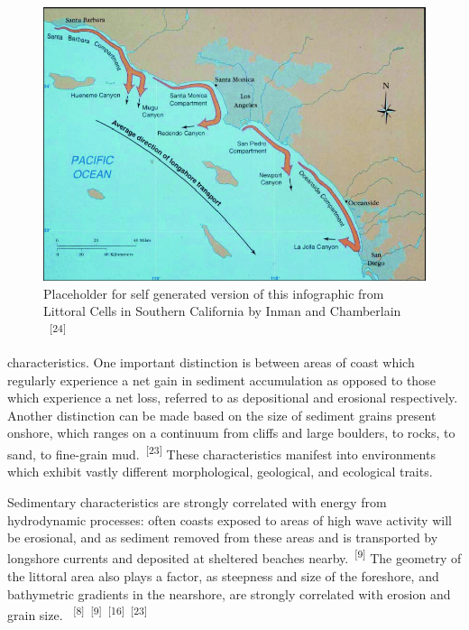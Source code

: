 \documentclass{article}
\begin{document}
\newpage
{}
\fancyfoot[C]{\thepage} 
\thispagestyle{fancy}

\begin{figure}
    \centering
    \includegraphics[width=.9\linewidth]{images/so-cal-littoral-cells.png}
    \caption{Placeholder for self generated version of this infographic from Littoral Cells in Southern California by Inman and Chamberlain ~\textsuperscript{[24]}}
    \label{figure6}
\end{figure}

\par{\noindent characteristics. One important distinction is between areas of coast which regularly experience a net gain in sediment accumulation as opposed to those which experience a net loss, referred to as depositional and erosional respectively. Another distinction can be made based on the size of sediment grains present onshore, which ranges on a continuum from cliffs and large boulders, to rocks, to sand, to fine-grain mud.~\textsuperscript{[23]} These characteristics manifest into environments which exhibit vastly different morphological, geological, and ecological traits.}

\par{Sedimentary characteristics are strongly correlated with energy from hydrodynamic processes: often coasts exposed to areas of high wave activity will be erosional, and as sediment removed from these areas and is transported by longshore currents and deposited at sheltered beaches nearby.~\textsuperscript{[9]} The geometry of the littoral area also plays a factor, as steepness and size of the foreshore, and bathymetric gradients in the nearshore, are strongly correlated with erosion and grain size. ~\textsuperscript{[8]}~\textsuperscript{[9]}~\textsuperscript{[16]}~\textsuperscript{[23]}} 
\end{document}
